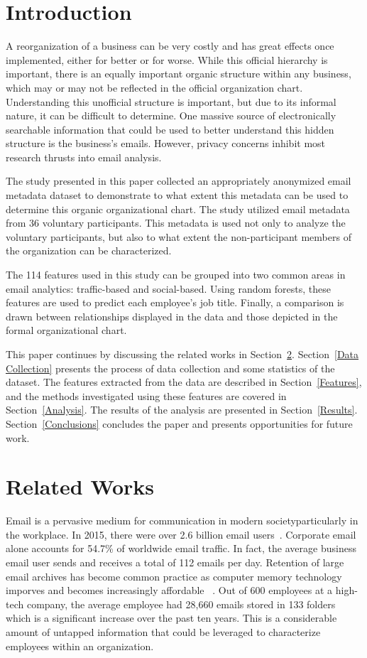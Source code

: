 \documentclass[10pt,twocolumn,conference]{IEEEtran}
\begin{document}
\section{Introduction}
A reorganization of a business can be very costly and has great effects once implemented, either for better or for worse.
While this official hierarchy is important, there is an equally important organic structure within any business, which may or may not be reflected in the official organization chart.
Understanding this unofficial structure is important, but due to its informal nature, it can be difficult to determine.
One massive source of electronically searchable information that could be used to better understand this hidden structure is the business's emails.
However, privacy concerns inhibit most research thrusts into email analysis.  

The study presented in this paper collected an appropriately anonymized email metadata dataset to demonstrate to what extent this metadata can be used to determine this organic organizational chart.
The study utilized email metadata from 36 voluntary participants.
This metadata is used not only to analyze the voluntary participants, but also to what extent the non-participant members of the organization can be characterized.

The 114 features used in this study can be grouped into two common areas in email analytics: traffic-based and social-based.
Using random forests, these features are used to predict each employee's job title.
Finally, a comparison is drawn between relationships displayed in the data and those depicted in the formal organizational chart.  

This paper continues by discussing the related works in Section~\ref{Related Works}.
Section~\ref{Data Collection} presents the process of data collection and some statistics of the dataset.
The features extracted from the data are described in Section~\ref{Features}, and the methods investigated using these features are covered in Section~\ref{Analysis}.
The results of the analysis are presented in Section~\ref{Results}.
Section~\ref{Conclusions} concludes the paper and presents opportunities for future work.  

\section{Related Works} \label{Related Works}

Email is a pervasive medium for communication in modern society\textemdash{}particularly in the workplace.
In 2015, there were over 2.6 billion email users~\cite{radicati_emails_2015}.
Corporate email alone accounts for 54.7\% of worldwide email traffic.
In fact, the average business email user sends and receives a total of 112 emails per day.
Retention of large email archives has become common practice as computer memory technology imporves and becomes increasingly affordable ~\cite{fisher_revisiting_2006}.
Out of 600 employees at a high-tech company, the average employee had 28,660 emails stored in 133 folders which is a significant increase over the past ten years.
This is a considerable amount of untapped information that could be leveraged to characterize employees within an organization.
\end{document}
